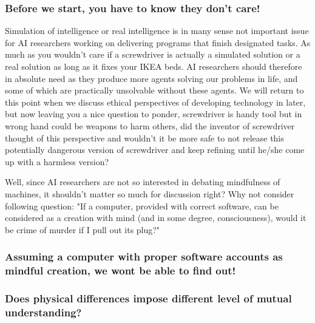 \documentclass[11pt]{article}
\newenvironment{sketch}{\color{dark-green-2}}{\ignorespacesafterend}
\newenvironment{draft}{\color{dark-cornflower-blue-2}}{\ignorespacesafterend}
\begin{document}
\subsubsection*{Before we start, you have to know they don't care!}
\begin{draft}
Simulation of intelligence or real intelligence is in many sense not important issue for AI researchers working on delivering programs that finish designated tasks. As much as you wouldn't care if a screwdriver is actually a simulated solution or a real solution as long as it fixes your IKEA beds. AI researchers should therefore in absolute need as they produce more agents solving our problems in life, and some of which are practically unsolvable without these agents. We will return to this point when we discuss ethical perspectives of developing technology in later, but now leaving you a nice question to ponder, screwdriver is handy tool but in wrong hand could be weapons to harm others, did the inventor of screwdriver thought of this perspective and wouldn’t it be more safe to not release this potentially dangerous version of screwdriver and keep refining until he/she come up with a harmless version?
  
Well, since AI researchers are not so interested in debating mindfulness of machines, it shouldn't matter so much for discussion right? Why not consider following question: "If a computer, provided with correct software, can be considered as a creation with mind (and in some degree, consciousness), would it be crime of murder if I pull out its plug?"
\end{draft}

\begin{sketch}
\subsubsection*{Assuming a computer with proper software accounts as mindful creation, we wont be able to find out!}

\subsubsection*{Does physical differences impose different level of mutual understanding?}
\end{sketch}
\end{document}
